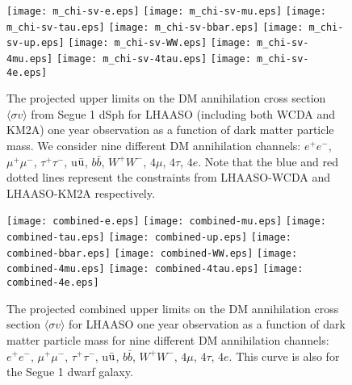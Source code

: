 \documentclass[12pt,prd,showpacs,amsmath,amssymb,aps,floats,floatfix,nofootinbib]{revtex4-1}
\begin{document}
\begin{figure*}[!htbp]
{\texttt{[image: m\_chi-sv-e.eps]}}
{\texttt{[image: m\_chi-sv-mu.eps]}}
{\texttt{[image: m\_chi-sv-tau.eps]}}
{\texttt{[image: m\_chi-sv-bbar.eps]}}
{\texttt{[image: m\_chi-sv-up.eps]}}
{\texttt{[image: m\_chi-sv-WW.eps]}}
{\texttt{[image: m\_chi-sv-4mu.eps]}}
{\texttt{[image: m\_chi-sv-4tau.eps]}}
{\texttt{[image: m\_chi-sv-4e.eps]}}
\caption{The projected upper limits on the DM annihilation cross section $\langle\sigma v\rangle$ from Segue 1 dSph for LHAASO (including both WCDA and KM2A) one year observation as a function of dark matter particle mass.
We consider nine different DM annihilation channels: $e^{+}e^{-}$, $\mu^{+}\mu^{-}$, $\tau^+\tau^-$, u$\bar{\rm u}$, $b\bar{b}$, $W^+W^-$, $4\mu$, $4\tau$, $4e$. Note that the blue and red dotted lines represent the constraints from LHAASO-WCDA and LHAASO-KM2A respectively.}
\label{fig:Lhaaso-wcda-km2a}
\end{figure*}

\begin{figure*}
	{\texttt{[image: combined-e.eps]}}
	{\texttt{[image: combined-mu.eps]}}
	{\texttt{[image: combined-tau.eps]}}
	{\texttt{[image: combined-up.eps]}}
	{\texttt{[image: combined-bbar.eps]}}
	{\texttt{[image: combined-WW.eps]}}
	{\texttt{[image: combined-4mu.eps]}}
	{\texttt{[image: combined-4tau.eps]}}
    {\texttt{[image: combined-4e.eps]}}
\caption{The projected combined upper limits on the DM annihilation cross section $\langle\sigma v\rangle$  for LHAASO one year observation as a function of dark matter particle mass for nine different DM annihilation channels: $e^{+}e^{-}$, $\mu^{+}\mu^{-}$, $\tau^+\tau^-$, u$\bar{\rm u}$, $b\bar{b}$, $W^+W^-$, $4\mu$, $4\tau$, $4e$. This curve is also for the Segue 1 dwarf galaxy.}
\label{fig:Lhaaso}
\end{figure*}
\end{document}
